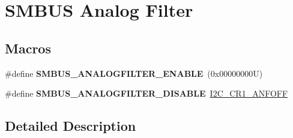 \hypertarget{group___s_m_b_u_s___analog___filter}{}\section{S\+M\+B\+US Analog Filter}
\label{group___s_m_b_u_s___analog___filter}
\subsection*{Macros}
\begin{DoxyCompactItemize}
\item 
\mbox{\label{group___s_m_b_u_s___analog___filter_ga4bff3657ddc77b456826db72d25ec893}} 
\#define {\bfseries S\+M\+B\+U\+S\+\_\+\+A\+N\+A\+L\+O\+G\+F\+I\+L\+T\+E\+R\+\_\+\+E\+N\+A\+B\+LE}~(0x00000000\+U)
\item 
\mbox{\label{group___s_m_b_u_s___analog___filter_gaa473e6db00a3ba7817373c2ccf5f9945}} 
\#define {\bfseries S\+M\+B\+U\+S\+\_\+\+A\+N\+A\+L\+O\+G\+F\+I\+L\+T\+E\+R\+\_\+\+D\+I\+S\+A\+B\+LE}~\hyperlink{group___peripheral___registers___bits___definition_ga4b33b8e33fa18fd49d6d1d8a69777289}{I2\+C\+\_\+\+C\+R1\+\_\+\+A\+N\+F\+O\+FF}
\end{DoxyCompactItemize}


\subsection{Detailed Description}

